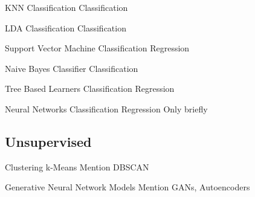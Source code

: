   \begin{frame}{KNN Classification}
  Classification
  \end{frame}

  \begin{frame}{LDA Classification}
  Classification
  \end{frame}

  \begin{frame}{Support Vector Machine}
  Classification
  Regression
  \end{frame}

  \begin{frame}{Naive Bayes Classifier}
  Classification
  \end{frame}

  \begin{frame}{Tree Based Learners}
  Classification
  Regression
  \end{frame}

  \begin{frame}{Neural Networks}
  Classification
  Regression
  Only briefly
  \end{frame}

  \subsection{Unsupervised}

  \begin{frame}{Clustering}
  k-Means
  Mention DBSCAN
  \end{frame}

  \begin{frame}{Generative Neural Network Models}
  Mention GANs, Autoencoders
  \end{frame}




